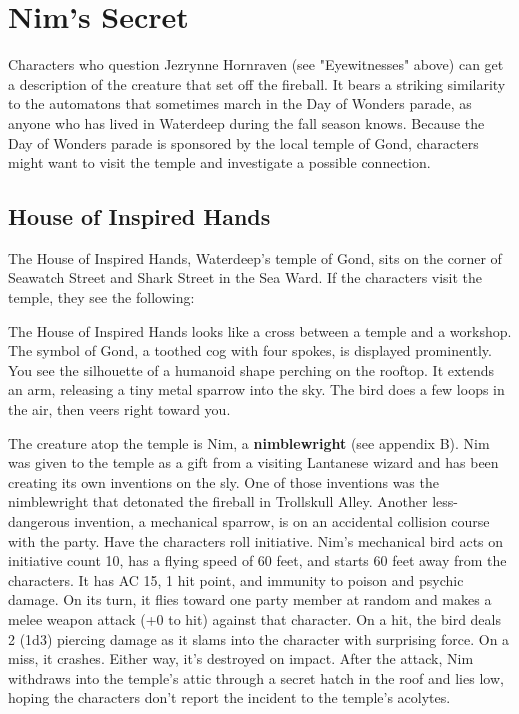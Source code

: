 \documentclass[10pt,a4paper,twoside,twocolumn,openany,nodeprecatedcode]{dndbook}
\begin{document}
\section{Nim's Secret}
Characters who question Jezrynne Hornraven (see "Eyewitnesses" above) can get a description of the creature that set off the fireball. It bears a striking similarity to the automatons that sometimes march in the Day of Wonders parade, as anyone who has lived in Waterdeep during the fall season knows. Because the Day of Wonders parade is sponsored by the local temple of Gond, characters might want to visit the temple and investigate a possible connection.
\subsection{House of Inspired Hands}
The House of Inspired Hands, Waterdeep's temple of Gond, sits on the corner of Seawatch Street and Shark Street in the Sea Ward. If the characters visit the temple, they see the following:
\begin{DndReadAloud}{}
The House of Inspired Hands looks like a cross between a temple and a workshop. The symbol of Gond, a toothed cog with four spokes, is displayed prominently. You see the silhouette of a humanoid shape perching on the rooftop. It extends an arm, releasing a tiny metal sparrow into the sky. The bird does a few loops in the air, then veers right toward you.
\end{DndReadAloud}

The creature atop the temple is Nim, a \textbf{nimblewright} (see appendix B). Nim was given to the temple as a gift from a visiting Lantanese wizard and has been creating its own inventions on the sly. One of those inventions was the nimblewright that detonated the fireball in Trollskull Alley. Another less-dangerous invention, a mechanical sparrow, is on an accidental collision course with the party.
Have the characters roll initiative. Nim's mechanical bird acts on initiative count 10, has a flying speed of 60 feet, and starts 60 feet away from the characters. It has AC 15, 1 hit point, and immunity to poison and psychic damage. On its turn, it flies toward one party member at random and makes a melee weapon attack (+0 to hit) against that character. On a hit, the bird deals 2 (1d3) piercing damage as it slams into the character with surprising force. On a miss, it crashes. Either way, it's destroyed on impact.
After the attack, Nim withdraws into the temple's attic through a secret hatch in the roof and lies low, hoping the characters don't report the incident to the temple's acolytes.
\end{document}
